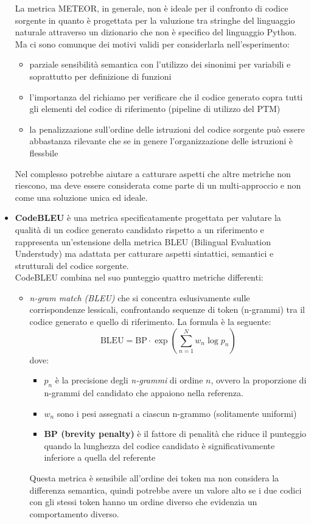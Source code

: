 \documentclass{article}
\begin{document}
\begin{itemize}
    La metrica METEOR, in generale, non è ideale per il confronto di codice sorgente in quanto è progettata per la valuzione tra stringhe del linguaggio naturale attraverso un dizionario che non è specifico del linguaggio Python. Ma ci sono comunque dei motivi validi per considerlarla nell'esperimento:
    \begin{itemize}
        \item parziale sensibilità semantica con l'utilizzo dei sinonimi per variabili e soprattutto per definizione di funzioni
        \item l'importanza del richiamo per verificare che il codice generato copra tutti gli elementi del codice di riferimento (pipeline di utilizzo del PTM)
        \item la penalizzazione sull'ordine delle istruzioni del codice sorgente può essere abbastanza rilevante che se in genere l'organizzazione delle istruzioni è flessbile
    \end{itemize}
    Nel complesso potrebbe aiutare a catturare aspetti che altre metriche non riescono, ma deve essere considerata come parte di un multi-approccio e non come una soluzione unica ed ideale.
    
    \item \textbf{CodeBLEU} \cite{ren2020codebleumethodautomaticevaluation} è una metrica specificatamente progettata per valutare la qualità di un codice generato candidato rispetto a un riferimento e rappresenta un'estensione della metrica BLEU (Bilingual Evaluation Understudy) \cite{10.3115/1073083.1073135} ma adattata per catturare aspetti sintattici, semantici e strutturali del codice sorgente.\\
    CodeBLEU combina nel suo punteggio quattro metriche differenti:
    \begin{itemize}
        \item \textit{n-gram match (BLEU)} che si concentra eslusivamente sulle corrispondenze lessicali, confrontando sequenze di token (n-grammi) tra il codice generato e quello di riferimento. La formula è la seguente:
        \[
            \text{BLEU} = \text{BP} \cdot \exp \left( \sum_{n=1}^{N} w_n \log p_n \right)
        \]
        dove:
        \begin{itemize}
            \item $p_n$ è la precisione degli \textit{n-grammi} di ordine $n$, ovvero la proporzione di n-grammi del candidato che appaiono nella referenza.
            \item $w_n$ sono i pesi assegnati a ciascun n-grammo (solitamente uniformi)
            \item \textbf{BP (brevity penalty)} è il fattore di penalità che riduce il punteggio quando la lunghezza del codice candidato è significativamente inferiore a quella del referente
        \end{itemize}
        Questa metrica è sensibile all'ordine dei token ma non considera la differenza semantica, quindi potrebbe avere un valore alto se i due codici con gli stessi token hanno un ordine diverso che evidenzia un comportamento diverso.


\end{itemize}
\end{itemize}
\end{document}

